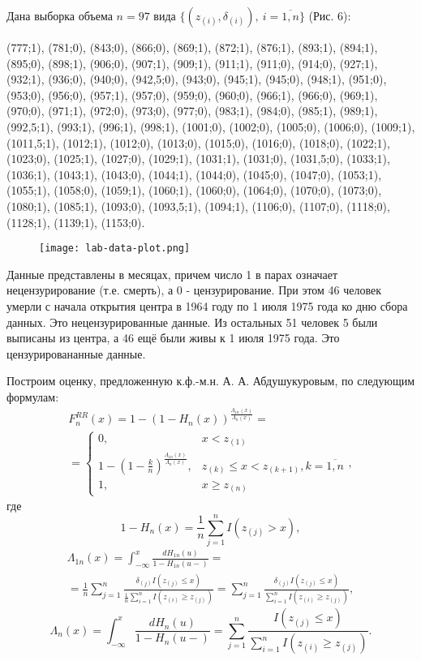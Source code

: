 Дана выборка объема $n = 97$ вида $\{(z_{(i)}, \delta_{(i)}),\ i=\overline{1,n}\}$ (Рис. 6):

(777;1), (781;0), (843;0), (866;0), (869;1), (872;1), (876;1), (893;1), (894;1), (895;0), (898;1), (906;0), (907;1), (909;1), (911;1), (911;0), (914;0), (927;1), (932;1), (936;0), (940;0), (942,5;0), (943;0), (945;1), (945;0), (948;1), (951;0), (953;0), (956;0), (957;1), (957;0), (959;0), (960;0), (966;1), (966;0), (969;1), (970;0), (971;1), (972;0), (973;0), (977;0), (983;1), (984;0), (985;1), (989;1), (992,5;1), (993;1), (996;1), (998;1), (1001;0), (1002;0), (1005;0), (1006;0), (1009;1), (1011,5;1), (1012;1), (1012;0), (1013;0), (1015;0), (1016;0), (1018;0), (1022;1), (1023;0), (1025;1), (1027;0), (1029;1), (1031;1), (1031;0), (1031,5;0), (1033;1), (1036;1), (1043;1), (1043;0), (1044;1), (1044;0), (1045;0), (1047;0), (1053;1), (1055;1), (1058;0), (1059;1), (1060;1), (1060;0), (1064;0), (1070;0), (1073;0), (1080;1), (1085;1), (1093;0), (1093,5;1), (1094;1), (1106;0), (1107;0), (1118;0), (1128;1), (1139;1), (1153;0).

\begin{figure}[h]
    \begin{center}
        \texttt{[image: lab-data-plot.png]}
        \caption{}
        \label{ris:experimcoded}
    \end{center}
\end{figure}

Данные представлены в месяцах, причем число 1 в парах означает нецензурирование (т.е. смерть), а 0 - цензурирование. При этом 46 человек умерли с начала открытия центра в 1964 году по 1 июля 1975 года ко дню сбора данных. Это нецензурированные данные. Из остальных 51 человек 5 были выписаны из центра, а 46 ещё были живы к 1 июля 1975 года. Это цензурировананные данные.

Построим оценку, предложенную к.ф.-м.н. А. А. Абдушукуровым, по следующим формулам:
\begin{multline*}
    F_n^{RR}(x) = 1 - (1 - H_n(x))^{\frac{\Lambda_{1n}(x)}{\Lambda_n(x)}} = \\ = \left\{ \begin{array}{cl} 0, & x < z_{(1)} \\ 1 - (1 - \frac{k}{n})^{\frac{\Lambda_{1n}(x)}{\Lambda_n(x)}}, & z_{(k)} \le x < z_{(k+1)}, k = \overline{1,n} \\ 1, & x \ge z_{(n)} \end{array} \right.,
\end{multline*}
где
\[
    1 - H_n(x) = \frac{1}{n} \sum_{j=1}^n I(z_{(j)} > x),
\]
\begin{multline*}
    \Lambda_{1n}(x) = \int_{-\infty}^x \frac{dH_{1n}(u)}{1 - H_{1n}(u-)} = \\ = \frac{1}{n} \sum_{j=1}^n \frac{\delta_{(j)} I(z_{(j)} \le x)}{\frac{1}{n} \sum_{i=1}^n I(z_{(i)} \ge z_{(j)})} = \sum_{j=1}^n \frac{\delta_{(j)} I(z_{(j)} \le x)}{\sum_{i=1}^n I(z_{(i)} \ge z_{(j)})},
\end{multline*}
\[
    \Lambda_{n}(x) = \int_{-\infty}^x \frac{dH_n(u)}{1 - H_n(u-)} = \sum_{j=1}^n \frac{I(z_{(j)} \le x)}{\sum_{i=1}^n I(z_{(i)} \ge z_{(j)})}.
\]

